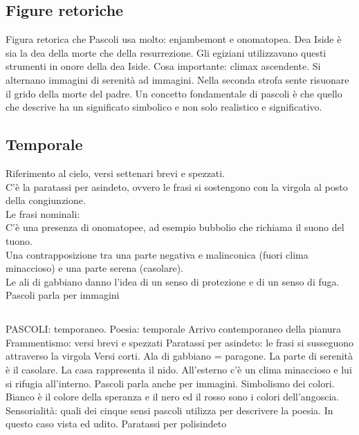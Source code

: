 \documentclass{article}
\begin{document}
\subsection{Figure retoriche}
Figura retorica che Pascoli usa molto: enjambemont e onomatopea.
Dea Iside è sia la dea della morte che della resurrezione. Gli egiziani utilizzavano questi strumenti in onore della dea Iside.
Cosa importante: climax ascendente. Si alternano immagini di serenità ad immagini.
Nella seconda strofa sente risuonare il grido della morte del padre. Un concetto fondamentale di pascoli è che quello che
descrive ha un significato simbolico e non solo realistico e significativo.

\subsection{Temporale}
Riferimento al cielo, versi settenari brevi e spezzati.\\
C'è la paratassi per asindeto, ovvero le frasi si sostengono con la virgola al posto della congiunzione.\\
Le frasi nominali: \\
C'è una presenza di onomatopee, ad esempio bubbolio che richiama il suono del tuono.\\
Una contrapposizione tra una parte negativa e malinconica (fuori clima minaccioso) e una parte serena (casolare).\\
Le ali di gabbiano danno l'idea di un senso di protezione e di un senso di fuga.\\
Pascoli parla per immagini

\subsection{}
PASCOLI: temporaneo.
Poesia: temporale
Arrivo contemporaneo della pianura
Frammentismo: versi brevi e spezzati
Paratassi per asindeto: le frasi si susseguono attraverso la virgola
Versi corti. Ala di gabbiano = paragone.
La parte di serenità è il casolare. La casa rappresenta il nido. All'esterno c'è un clima minaccioso e lui si rifugia all'interno.
Pascoli parla anche per immagini. Simbolismo dei colori. Bianco è il colore della speranza e il nero ed il rosso sono i colori
dell'angoscia. Sensorialità: quali dei cinque sensi pascoli utilizza per descrivere la poesia. In questo caso vista ed udito.
Paratassi per polisindeto
\end{document}
